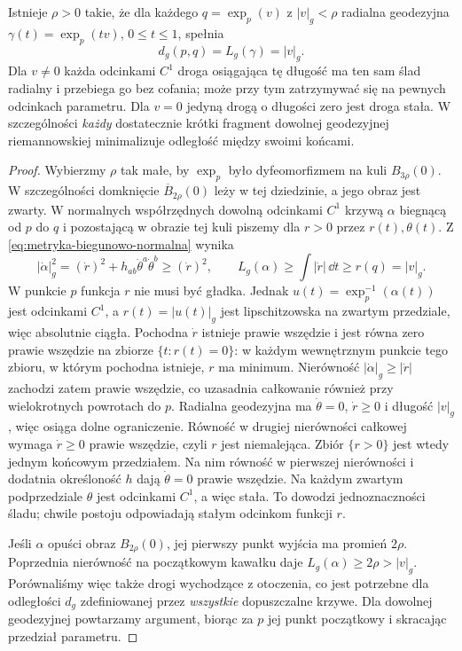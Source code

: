\begin{twierdzenie}
\label{thm:lokalna-minimalnosc-geodezyjnej}
Istnieje $\rho>0$ takie, że dla każdego
$q=\exp_p(v)$ z $|v|_g<\rho$ radialna
geodezyjna $\gamma(t)=\exp_p(tv)$,
$0\leq t\leq1$, spełnia
\begin{equation}\label{eq:odleglosc-exp-lokalna}
 d_g(p,q)=L_g(\gamma)=|v|_g.
\end{equation}
Dla $v\ne0$ każda odcinkami $C^1$ droga osiągająca tę
długość ma ten sam ślad radialny i przebiega go bez cofania;
może przy tym zatrzymywać się na pewnych odcinkach parametru.
Dla $v=0$ jedyną drogą o długości zero jest droga stała. W szczególności \emph{każdy}
dostatecznie krótki fragment dowolnej
geodezyjnej riemannowskiej minimalizuje
odległość między swoimi końcami.
\end{twierdzenie}
\begin{proof}
Wybierzmy $\rho$ tak małe, by
$\exp_p$ było dyfeomorfizmem na kuli $B_{3\rho}(0)$.
W szczególności domknięcie $\overline B_{2\rho}(0)$
leży w tej dziedzinie, a jego obraz jest zwarty. W normalnych współrzędnych
dowolną odcinkami $C^1$ krzywą $\alpha$
biegnącą od $p$ do $q$ i pozostającą
w obrazie tej kuli piszemy dla $r>0$
przez $r(t),\theta(t)$. Z \eqref{eq:metryka-biegunowo-normalna}
wynika
\[
 |\dot\alpha|_g^2
 =(\dot r)^2+h_{ab}\dot\theta^a\dot\theta^b
 \geq (\dot r)^2,
 \qquad
 L_g(\alpha)\geq\int|\dot r|\,\dd t
 \geq r(q)=|v|_g.
\]
W punkcie $p$ funkcja $r$ nie musi być gładka.
Jednak $u(t)=\exp_p^{-1}(\alpha(t))$ jest odcinkami $C^1$,
a $r(t)=|u(t)|_g$ jest lipschitzowska na zwartym przedziale,
więc absolutnie ciągła. Pochodna $\dot r$ istnieje prawie
wszędzie i jest równa zero prawie wszędzie na zbiorze
$\{t:r(t)=0\}$: w każdym wewnętrznym punkcie tego zbioru,
w którym pochodna istnieje, $r$ ma minimum. Nierówność
$|\dot\alpha|_g\geq|\dot r|$ zachodzi zatem prawie wszędzie,
co uzasadnia całkowanie również przy wielokrotnych powrotach do $p$. Radialna geodezyjna
ma $\dot\theta=0$, $\dot r\geq0$ i długość
$|v|_g$, więc osiąga dolne ograniczenie.
Równość w drugiej nierówności całkowej wymaga
$\dot r\geq0$ prawie wszędzie, czyli $r$ jest niemalejąca.
Zbiór $\{r>0\}$ jest wtedy jednym końcowym przedziałem.
Na nim równość w pierwszej nierówności i dodatnia
określoność $h$ dają $\dot\theta=0$ prawie wszędzie.
Na każdym zwartym podprzedziale $\theta$ jest odcinkami
$C^1$, a więc stała. To dowodzi jednoznaczności śladu;
chwile postoju odpowiadają stałym odcinkom funkcji $r$.

Jeśli $\alpha$ opuści obraz $B_{2\rho}(0)$,
jej pierwszy punkt wyjścia ma promień $2\rho$.
Poprzednia nierówność na początkowym kawałku
daje $L_g(\alpha)\geq2\rho>|v|_g$.
Porównaliśmy więc także drogi wychodzące
z otoczenia, co jest potrzebne dla odległości
$d_g$ zdefiniowanej przez \emph{wszystkie}
dopuszczalne krzywe. Dla dowolnej geodezyjnej
powtarzamy argument, biorąc za $p$ jej punkt
początkowy i skracając przedział parametru.
\end{proof}


